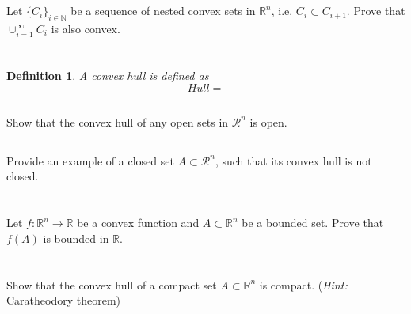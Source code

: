 \documentclass[]{article}
\newcommand{\R}{\mathbb{R}}
\newcommand{\N}{\mathbb{N}}
\newtheorem{definition}{Definition}
\begin{document}
\newpage
\section{}
Let $\{C_i\}_{i \in \N}$ be a sequence of nested convex sets in $\R^n$, i.e. $C_i \subset C_{i+1}$.
Prove that $\cup_{i = 1}^\infty C_i$ is also convex.





















\newpage
\section{}

\begin{definition}
    A \emph{\underline{convex hull}} is defined as
    \[
        Hull=
    \]
\end{definition}

\subsection{}
Show that the convex hull of any open sets in $\mathcal{R}^n$ is open.










\subsection{}
Provide an example of a closed set $A \subset \mathcal{R}^n$, such that its convex hull is not closed.












\newpage
\section{}
Let $f : \R^n \to \R$ be a convex function and $A \subset \R^n$ be a bounded set.
Prove that $f(A)$ is bounded in $\R$.













\newpage
\section{}
Show that the convex hull of a compact set $A \subset \R^n$ is compact.
(\textit{Hint:} Caratheodory theorem)
\end{document}
